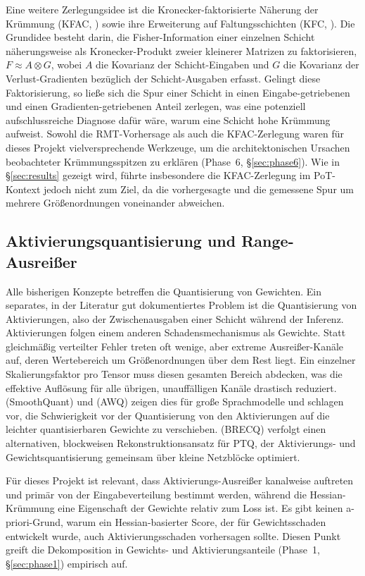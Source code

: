 Eine weitere Zerlegungsidee ist die Kronecker-faktorisierte Näherung der Krümmung (KFAC, \citet{martens_kfac_2015}) sowie ihre Erweiterung auf Faltungsschichten (KFC, \citet{grosse_kfc_2016}). Die Grundidee besteht darin, die Fisher-Information einer einzelnen Schicht näherungsweise als Kronecker-Produkt zweier kleinerer Matrizen zu faktorisieren, $F \approx A \otimes G$, wobei $A$ die Kovarianz der Schicht-Eingaben und $G$ die Kovarianz der Verlust-Gradienten bezüglich der Schicht-Ausgaben erfasst. Gelingt diese Faktorisierung, so ließe sich die Spur einer Schicht in einen Eingabe-getriebenen und einen Gradienten-getriebenen Anteil zerlegen, was eine potenziell aufschlussreiche Diagnose dafür wäre, warum eine Schicht hohe Krümmung aufweist. Sowohl die RMT-Vorhersage als auch die KFAC-Zerlegung waren für dieses Projekt vielversprechende Werkzeuge, um die architektonischen Ursachen beobachteter Krümmungsspitzen zu erklären (Phase~6, \S\ref{sec:phase6}). Wie in \S\ref{sec:results} gezeigt wird, führte insbesondere die KFAC-Zerlegung im PoT-Kontext jedoch nicht zum Ziel, da die vorhergesagte und die gemessene Spur um mehrere Größenordnungen voneinander abweichen.

\subsection{Aktivierungsquantisierung und Range-Ausreißer}
\label{sec:fund-activation}

Alle bisherigen Konzepte betreffen die Quantisierung von Gewichten. Ein separates, in der Literatur gut dokumentiertes Problem ist die Quantisierung von Aktivierungen, also der Zwischenausgaben einer Schicht während der Inferenz. Aktivierungen folgen einem anderen Schadensmechanismus als Gewichte. Statt gleichmäßig verteilter Fehler treten oft wenige, aber extreme Ausreißer-Kanäle auf, deren Wertebereich um Größenordnungen über dem Rest liegt. Ein einzelner Skalierungsfaktor pro Tensor muss diesen gesamten Bereich abdecken, was die effektive Auflösung für alle übrigen, unauffälligen Kanäle drastisch reduziert. \citet{xiao_smoothquant_2023} (SmoothQuant) und \citet{lin_awq_2024} (AWQ) zeigen dies für große Sprachmodelle und schlagen vor, die Schwierigkeit vor der Quantisierung von den Aktivierungen auf die leichter quantisierbaren Gewichte zu verschieben. \citet{li_brecq_2021} (BRECQ) verfolgt einen alternativen, blockweisen Rekonstruktionsansatz für PTQ, der Aktivierungs- und Gewichtsquantisierung gemeinsam über kleine Netzblöcke optimiert.
\par\medskip

Für dieses Projekt ist relevant, dass Aktivierungs-Ausreißer kanalweise auftreten und primär von der Eingabeverteilung bestimmt werden, während die Hessian-Krümmung eine Eigenschaft der Gewichte relativ zum Loss ist. Es gibt keinen a-priori-Grund, warum ein Hessian-basierter Score, der für Gewichtsschaden entwickelt wurde, auch Aktivierungsschaden vorhersagen sollte. Diesen Punkt greift die Dekomposition in Gewichts- und Aktivierungsanteile (Phase~1, \S\ref{sec:phase1}) empirisch auf.